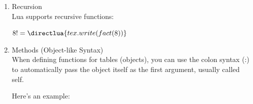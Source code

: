 \begin{enumerate}[label=(\alph*)]
\begin{itemize}
\begin{tkzexample}[latex=.2\textwidth]
{    tex.print(sum_all(1, 2, 3, 4))
    }
  \end{tkzexample}


\item   Second example:

Here, I'm using a new function from the  package, which replaces an old Lua function , which was used to obtain the size of the table.

  \begin{tkzexample}[latex=.2\textwidth]
  \end{tkzexample}


\item   Third example:

It's always possible to use \#, with a little effort (technique).

\begin{tkzexample}[latex=.2\textwidth]
 \bgroup
 \catcode`\#=12
 \egroup
\end{tkzexample}
\end{itemize}


\item  Recursion\\

Lua supports recursive functions:

\begin{tkzexample}[latex=.4\textwidth]
  \newcommand*{\luafact}[1]{\directlua{
    tex.write(fact(\the\numexpr(#1)\relax))}%
  }
  $8! = \luafact{8}$
\end{tkzexample}



\item Methods (Object-like Syntax)\\

When defining functions for tables (objects), you can use the colon syntax (:) to automatically pass the object itself as the first argument, usually called self.

Here's an example:



\end{enumerate}
